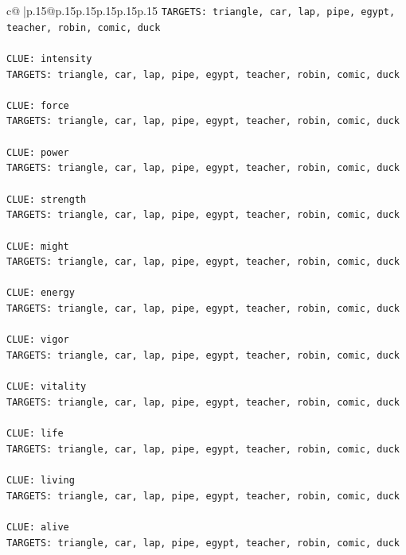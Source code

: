 \documentclass{article}
\begin{document}
{\begin{supertabular}{c@{$\;$}|p{.15\linewidth}@{}p{.15\linewidth}p{.15\linewidth}p{.15\linewidth}p{.15\linewidth}p{.15\linewidth}}
{{{\texttt{TARGETS: triangle, car, lap, pipe, egypt, teacher, robin, comic, duck} \\
\\ 
\texttt{CLUE: intensity} \\
\texttt{TARGETS: triangle, car, lap, pipe, egypt, teacher, robin, comic, duck} \\
\\ 
\texttt{CLUE: force} \\
\texttt{TARGETS: triangle, car, lap, pipe, egypt, teacher, robin, comic, duck} \\
\\ 
\texttt{CLUE: power} \\
\texttt{TARGETS: triangle, car, lap, pipe, egypt, teacher, robin, comic, duck} \\
\\ 
\texttt{CLUE: strength} \\
\texttt{TARGETS: triangle, car, lap, pipe, egypt, teacher, robin, comic, duck} \\
\\ 
\texttt{CLUE: might} \\
\texttt{TARGETS: triangle, car, lap, pipe, egypt, teacher, robin, comic, duck} \\
\\ 
\texttt{CLUE: energy} \\
\texttt{TARGETS: triangle, car, lap, pipe, egypt, teacher, robin, comic, duck} \\
\\ 
\texttt{CLUE: vigor} \\
\texttt{TARGETS: triangle, car, lap, pipe, egypt, teacher, robin, comic, duck} \\
\\ 
\texttt{CLUE: vitality} \\
\texttt{TARGETS: triangle, car, lap, pipe, egypt, teacher, robin, comic, duck} \\
\\ 
\texttt{CLUE: life} \\
\texttt{TARGETS: triangle, car, lap, pipe, egypt, teacher, robin, comic, duck} \\
\\ 
\texttt{CLUE: living} \\
\texttt{TARGETS: triangle, car, lap, pipe, egypt, teacher, robin, comic, duck} \\
\\ 
\texttt{CLUE: alive} \\
\texttt{TARGETS: triangle, car, lap, pipe, egypt, teacher, robin, comic, duck} \\
}}}
\end{supertabular}}
\end{document}
